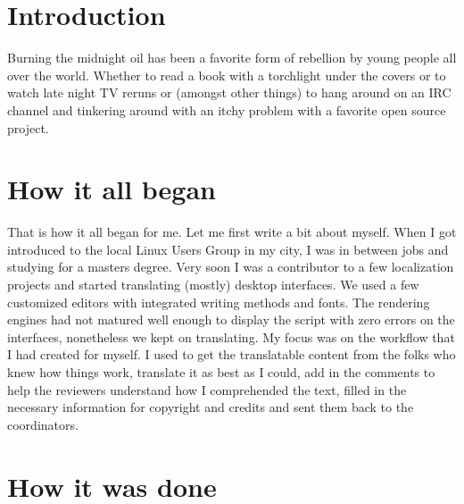 

\section*{Introduction}

Burning the midnight oil has been a favorite form of rebellion by young people
all over the world. Whether to read a book with a torchlight under the covers or
to watch late night TV reruns or (amongst other things) to hang around on an IRC
channel and tinkering around with an itchy problem with a favorite open source
project. 

\section*{How it all began}

That is how it all began for me. Let me first write a bit about myself. When I
got introduced to the local Linux Users Group in my city, I was in between jobs
and studying for a masters degree. Very soon I was a contributor to a few
localization projects and started translating (mostly) desktop interfaces. We
used a few customized editors with integrated writing methods and fonts. The
rendering engines had not matured well enough to display the script with zero
errors on the interfaces, nonetheless we kept on translating. My focus was on
the workflow that I had created for myself. I used to get the translatable
content from the folks who knew how things work, translate it as best as I
could, add in the comments to help the reviewers understand how I comprehended
the text, filled in the necessary information for copyright and credits and sent
them back to the coordinators.

\section*{How it was done}


